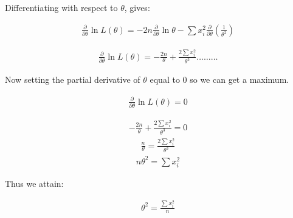 \documentclass{article}
\begin{document}
Differentiating with respect to $\theta$, gives:

\begin{align}
    \frac{\partial }{\partial \theta}\ln L{(\theta)} = -2n\frac{\partial}{\partial\theta}\ln\theta - \sum x_{i}^2\frac{\partial}{\partial\theta}(\frac{1}{\theta^2})
\end{align}

\begin{align}
    \frac{\partial }{\partial \theta}\ln L{(\theta)} = -\frac{2n}{\theta} + \frac{2\sum x_{i}^2}{\theta^3} \dots \dots \dots
\end{align}

Now setting the partial derivative of $\theta$ equal to $0$ so we can get a maximum.

\begin{align}
    \frac{\partial }{\partial \theta}\ln L{(\theta)} = 0
\end{align}

\begin{align}
    -\frac{2n}{\theta} + \frac{2\sum x_{i}^2}{\theta^3} = 0
\end{align}
\begin{align}
    \frac{n}{\theta} = \frac{2\sum x_{i}^2}{\theta^3}
\end{align}
\begin{align}
  n\theta^2= \sum x_{i}^2
\end{align}

Thus we attain:

\begin{align}
    \theta^2 = \frac{\sum x_{i}^2}{n}
\end{align}





\end{document}
